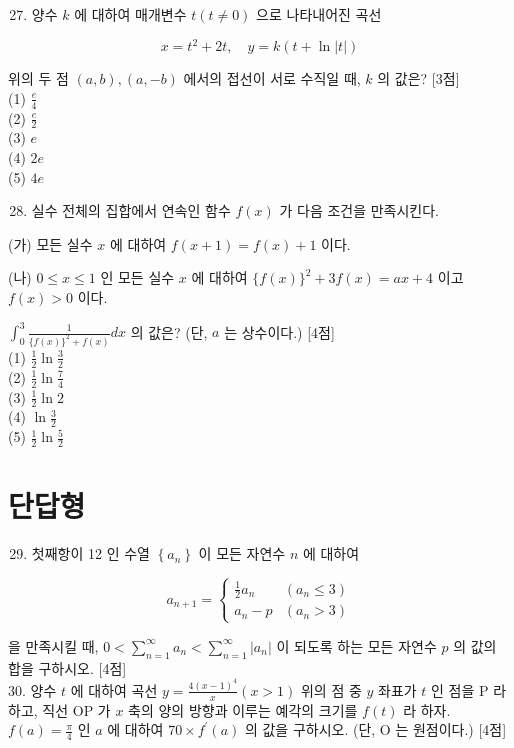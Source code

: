 \documentclass[10pt]{article}
\begin{document}
\begin{enumerate}
  \setcounter{enumi}{26}
  \item 양수 \(k\) 에 대하여 매개변수 \(t(t \neq 0)\) 으로 나타내어진 곡선
\end{enumerate}

\[
x=t^{2}+2 t, \quad y=k(t+\ln |t|)
\]

위의 두 점 \((a, b),(a,-b)\) 에서의 접선이 서로 수직일 때, \(k\) 의 값은? [3점]\\
(1) \(\frac{e}{4}\)\\
(2) \(\frac{e}{2}\)\\
(3) \(e\)\\
(4) \(2 e\)\\
(5) \(4 e\)

\begin{enumerate}
  \setcounter{enumi}{27}
  \item 실수 전체의 집합에서 연속인 함수 \(f(x)\) 가 다음 조건을 만족시킨다.
\end{enumerate}

(가) 모든 실수 \(x\) 에 대하여 \(f(x+1)=f(x)+1\) 이다.

(나) \(0 \leq x \leq 1\) 인 모든 실수 \(x\) 에 대하여 \(\{f(x)\}^{2}+3 f(x)=a x+4\) 이고 \(f(x)>0\) 이다.

\(\int_{0}^{3} \frac{1}{\{f(x)\}^{2}+f(x)} d x\) 의 값은? (단, \(a\) 는 상수이다.) [4점]\\
(1) \(\frac{1}{2} \ln \frac{3}{2}\)\\
(2) \(\frac{1}{2} \ln \frac{7}{4}\)\\
(3) \(\frac{1}{2} \ln 2\)\\
(4) \(\ln \frac{3}{2}\)\\
(5) \(\frac{1}{2} \ln \frac{5}{2}\)

\section*{단답형}
\begin{enumerate}
  \setcounter{enumi}{28}
  \item 첫째항이 12 인 수열 \(\left\{a_{n}\right\}\) 이 모든 자연수 \(n\) 에 대하여
\end{enumerate}

\[
a_{n+1}= \begin{cases}\frac{1}{2} a_{n} & \left(a_{n} \leq 3\right) \\ a_{n}-p & \left(a_{n}>3\right)\end{cases}
\]

을 만족시킬 때, \(0<\sum_{n=1}^{\infty} a_{n}<\sum_{n=1}^{\infty}\left|a_{n}\right|\) 이 되도록 하는 모든 자연수 \(p\) 의 값의 합을 구하시오. [4점]\\
30. 양수 \(t\) 에 대하여 곡선 \(y=\frac{4(x-1)^{4}}{x}(x>1)\) 위의 점 중 \(y\) 좌표가 \(t\) 인 점을 P 라 하고, 직선 OP 가 \(x\) 축의 양의 방향과 이루는 예각의 크기를 \(f(t)\) 라 하자. \(f(a)=\frac{\pi}{4}\) 인 \(a\) 에 대하여 \(70 \times f^{\prime}(a)\) 의 값을 구하시오. (단, O 는 원점이다.) [4점]
\end{document}
